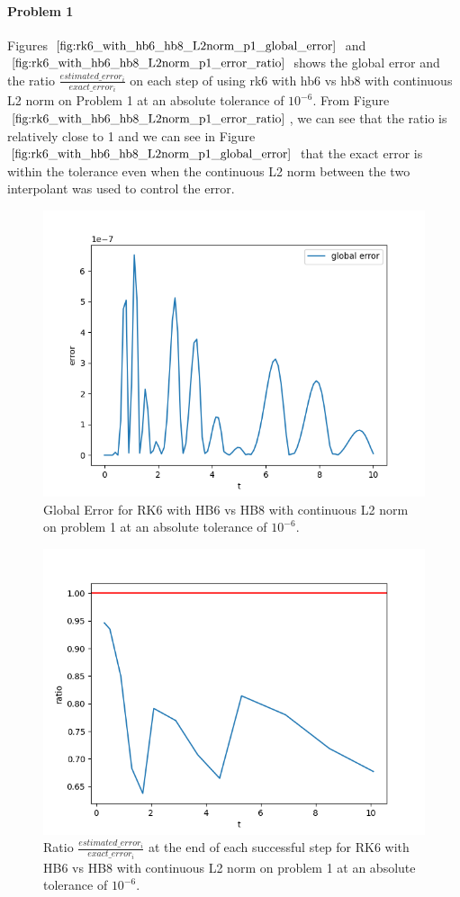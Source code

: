 \paragraph{Problem 1} Figures $\ref{fig:rk6_with_hb6_hb8_L2norm_p1_global_error}$ and $\ref{fig:rk6_with_hb6_hb8_L2norm_p1_error_ratio}$ shows the global error and the ratio $\frac{estimated\_error_i}{exact\_error_i}$ on each step of using rk6 with hb6 vs hb8 with continuous L2 norm on Problem 1 at an absolute tolerance of $10^{-6}$. From Figure $\ref{fig:rk6_with_hb6_hb8_L2norm_p1_error_ratio}$, we can see that the ratio is relatively close to 1 and we can see in Figure $\ref{fig:rk6_with_hb6_hb8_L2norm_p1_global_error}$ that the exact error is within the tolerance even when the continuous L2 norm between the two interpolant was used to control the error.

\begin{figure}[H]
\centering
\includegraphics[width=0.7\linewidth]{./figures/rk6_with_hb6_hb8_L2norm_p1_global_error}
\caption{Global Error for RK6 with HB6 vs HB8 with continuous L2 norm on problem 1 at an absolute tolerance of $10^{-6}$.}
\label{fig:rk6_with_hb6_hb8_L2norm_p1_global_error}
\end{figure}

\begin{figure}[H]
\centering
\includegraphics[width=0.7\linewidth]{./figures/rk6_with_hb6_hb8_L2norm_p1_error_ratio}
\caption{Ratio $\frac{estimated\_error_i}{exact\_error_i}$ at the end of each successful step for RK6 with HB6 vs HB8 with continuous L2 norm on problem 1 at an absolute tolerance of $10^{-6}$.}
\label{fig:rk6_with_hb6_hb8_L2norm_p1_error_ratio}
\end{figure}

